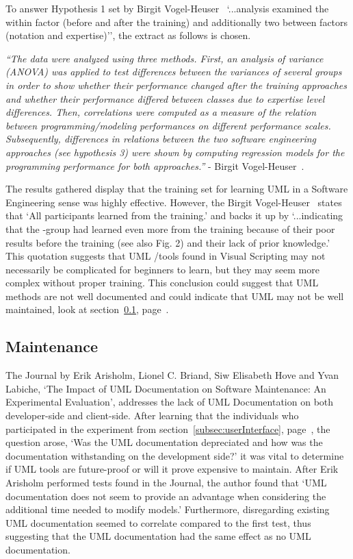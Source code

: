 \documentclass[12pt]{report} %
\begin{document}
			\newpage
			To answer Hypothesis 1 set by Birgit Vogel-Heuser~\cite{vogel-heuser_evaluation_2013} `...analysis examined the within factor (before and after the training) and additionally two between factors (notation and expertise)'', the extract as follows is chosen.
			\begin{center}
				\textit{``The data were analyzed using three methods. First, an analysis of variance (ANOVA) was applied to test differences between the variances of several groups in order to show whether their performance changed after the training approaches and whether their performance differed between classes due to expertise level differences. Then, correlations were computed as a measure of the relation between programming/modeling performances on different performance scales. Subsequently, differences in relations between the two software engineering approaches (see hypothesis 3) were shown by computing regression models for the programming performance for both approaches.''} - Birgit Vogel-Heuser~\cite{vogel-heuser_evaluation_2013}. 
			\end{center}
				
			The results gathered display that the training set for learning UML in a Software Engineering sense was highly effective. However, the Birgit Vogel-Heuser~\cite{vogel-heuser_evaluation_2013} states that `All participants learned from the training.' and backs it up by `...indicating that the -group had learned even more from the training because of their poor results before the training (see also Fig. 2) and their lack of prior knowledge.' This quotation suggests that UML /tools found in Visual Scripting may not necessarily be complicated for beginners to learn, but they may seem more complex without proper training. This conclusion could suggest that UML methods are not well documented and could indicate that UML may not be well maintained, look at section~\ref{subsec:maintenance}, page~\pageref{subsec:maintenance}.

		\subsection{Maintenance}
		\label{subsec:maintenance}
			The Journal by Erik Arisholm, Lionel C. Briand, Siw Elisabeth Hove and Yvan Labiche, `The Impact of UML Documentation on Software Maintenance: An Experimental Evaluation', addresses the lack of UML Documentation on both developer-side and client-side. After learning that the individuals who participated in the experiment from section~\ref{subsec:userInterface}, page~\pageref{subsec:userInterface}, the question arose, `Was the UML documentation depreciated and how was the documentation withstanding on the development side?' it was vital to determine if UML tools are future-proof or will it prove expensive to maintain. After Erik Arisholm performed tests found in the Journal, the author found that `UML documentation does not seem to provide an advantage when considering the additional time needed to modify models.' Furthermore, disregarding existing UML documentation seemed to correlate compared to the first test, thus suggesting that the UML documentation had the same effect as no UML documentation.
\end{document}
